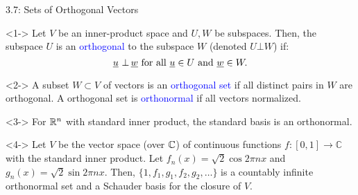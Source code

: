 \documentclass[10pt,letterpaper,english]{beamer}
\begin{document}
\begin{frame}{3.7: Sets of Orthogonal Vectors}

\begin{definition}<1->
Let $V$ be an inner-product space and $U,W$ be subspaces.
Then, the subspace $U$ is an \textcolor{blue}{orthogonal} to the subspace $W$ (denoted $U \bot W$) if: \vspace{-1.5mm}
$$ \underline{u} \ \bot \, \underline{w} \text{  for all } \underline{u}\in U \text{ and } \underline{w}\in W. $$
\end{definition}

\begin{definition}<2->
A subset $W\subset V$ of vectors is an \textcolor{blue}{orthogonal set} if all distinct pairs in $W$ are orthogonal.
A orthogonal set is \textcolor{blue}{orthonormal} if all vectors normalized.
\end{definition}

\begin{example}<3->
For $\mathbb{R}^n$ with standard inner product, the standard basis is an orthonormal.
\end{example}

\begin{example}<4->
Let $V$ be the vector space (over $\mathbb{C}$) of continuous functions $f\colon [0,1]\to\mathbb{C}$ with the standard inner product.
Let $f_n(x) = \sqrt{2} \cos 2 \pi n x$ and $g_n (x) = \sqrt{2} \sin 2 \pi n x$.
Then, $\{ 1, f_1, g_1, f_2, g_2, \ldots \}$ is a countably infinite orthonormal set and a Schauder basis for the closure of $V$.
\end{example}

\end{frame}
\end{document}
